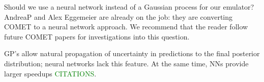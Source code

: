 \documentclass[11pt]{article}
\begin{document}
Should we use a neural network instead of a Gaussian process for our emulator? AndreaP and Alex Eggemeier are already on the job: they are converting COMET to a neural network approach. We recommend that the reader follow future COMET papers for investigations into this question.

GP's allow natural propagation of
uncertainty in predictions to the final posterior distribution; neural
networks lack this feature. At the same time, NNs provide larger speedups \textcolor{green}{CITATIONS}.

 {
    \printbibliography
}
\end{document}
